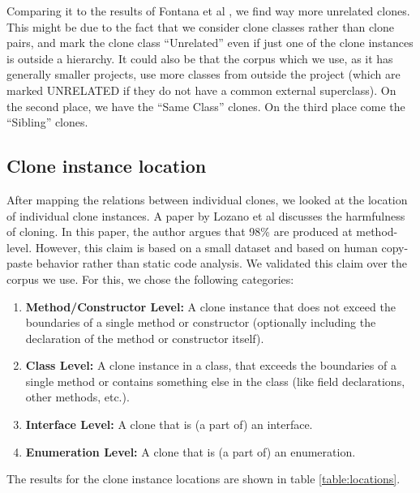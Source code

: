 \documentclass[a4paper]{article}
\begin{document}
Comparing it to the results of Fontana et al \cite{fontana2015duplicated}, we find way more unrelated clones. This might be due to the fact that we consider clone classes rather than clone pairs, and mark the clone class ``Unrelated'' even if just one of the clone instances is outside a hierarchy. It could also be that the corpus which we use, as it has generally smaller projects, use more classes from outside the project (which are marked UNRELATED if they do not have a common external superclass). On the second place, we have the ``Same Class'' clones. On the third place come the ``Sibling'' clones.

\subsection{Clone instance location}
After mapping the relations between individual clones, we looked at the location of individual clone instances. A paper by Lozano et al \cite{lozano2007evaluating} discusses the harmfulness of cloning. In this paper, the author argues that 98\% are produced at method-level. However, this claim is based on a small dataset and based on human copy-paste behavior rather than static code analysis. We validated this claim over the corpus we use. For this, we chose the following categories:
\begin{enumerate}
  \item \textbf{Method/Constructor Level:} A clone instance that does not exceed the boundaries of a single method or constructor (optionally including the declaration of the method or constructor itself).
  \item \textbf{Class Level:} A clone instance in a class, that exceeds the boundaries of a single method or contains something else in the class (like field declarations, other methods, etc.).
  \item \textbf{Interface Level:} A clone that is (a part of) an interface.
  \item \textbf{Enumeration Level:} A clone that is (a part of) an enumeration.
\end{enumerate}

The results for the clone instance locations are shown in table \ref{table:locations}.
\end{document}
